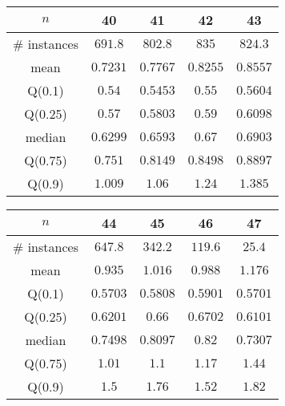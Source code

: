 \begin{tabular}{c|cccc} 
\hline 
$n$ & 40 & 41 & 42 & 43 \tabularnewline 
\hline 
\hline 
\# instances & $691.8$ & $802.8$ & $835$ & $824.3$ \tabularnewline 
mean & $0.7231$ & $0.7767$ & $0.8255$ & $0.8557$ \tabularnewline 
Q(0.1) & $0.54$ & $0.5453$ & $0.55$ & $0.5604$ \tabularnewline 
Q(0.25) & $0.57$ & $0.5803$ & $0.59$ & $0.6098$ \tabularnewline 
median & $0.6299$ & $0.6593$ & $0.67$ & $0.6903$ \tabularnewline 
Q(0.75) & $0.751$ & $0.8149$ & $0.8498$ & $0.8897$ \tabularnewline 
Q(0.9) & $1.009$ & $1.06$ & $1.24$ & $1.385$ \tabularnewline 
\hline 
\end{tabular} 
\medskip{} 

\begin{tabular}{c|cccc} 
\hline 
$n$ & 44 & 45 & 46 & 47 \tabularnewline 
\hline 
\hline 
\# instances & $647.8$ & $342.2$ & $119.6$ & $25.4$ \tabularnewline 
mean & $0.935$ & $1.016$ & $0.988$ & $1.176$ \tabularnewline 
Q(0.1) & $0.5703$ & $0.5808$ & $0.5901$ & $0.5701$ \tabularnewline 
Q(0.25) & $0.6201$ & $0.66$ & $0.6702$ & $0.6101$ \tabularnewline 
median & $0.7498$ & $0.8097$ & $0.82$ & $0.7307$ \tabularnewline 
Q(0.75) & $1.01$ & $1.1$ & $1.17$ & $1.44$ \tabularnewline 
Q(0.9) & $1.5$ & $1.76$ & $1.52$ & $1.82$ \tabularnewline 
\hline 
\end{tabular} 
\medskip{} 

